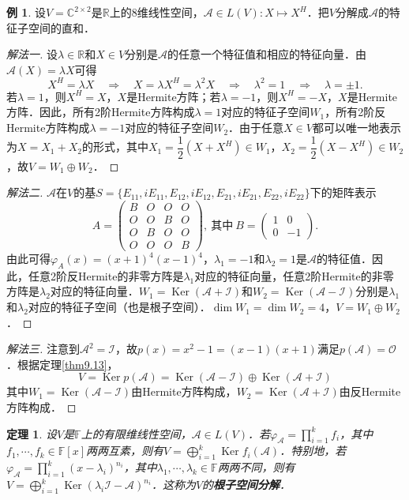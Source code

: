 \documentclass[a4paper,fontset=windows]{ctexbook}
\newtheorem{theorem}{定理}[chapter]
\theoremstyle{definition}
\newtheorem{example}{例}[chapter]
\DeclareMathOperator{\Ker}{Ker}
\begin{document}
\begin{example}
设$V=\mathbb{C}^{2\times 2}$是$\mathbb{R}$上的8维线性空间，$\mathcal{A}\in L(V):X\mapsto X^H$．把$V$分解成$\mathcal{A}$的特征子空间的直和．
\end{example}

\begin{proof}[解法一]
设$\lambda\in\mathbb{R}$和$X\in V$分别是$\mathcal{A}$的任意一个特征值和相应的特征向量．由$\mathcal{A}(X)=\lambda X$可得
$$X^H=\lambda X\quad\Rightarrow\quad X=\lambda X^H=\lambda^2X\quad\Rightarrow\quad\lambda^2=1\quad\Rightarrow\quad\lambda=\pm 1.$$
若$\lambda=1$，则$X^H=X$，$X$是Hermite方阵；若$\lambda=-1$，则$X^H=-X$，$X$是Hermite方阵．因此，所有2阶Hermite方阵构成$\lambda=1$对应的特征子空间$W_1$，所有2阶反Hermite方阵构成$\lambda=-1$对应的特征子空间$W_2$．由于任意$X\in V$都可以唯一地表示为$X=X_1+X_2$的形式，其中$X_1=\dfrac{1}{2}(X+X^H)\in W_1$，$X_2=\dfrac{1}{2}(X-X^H)\in W_2$，故$V=W_1\oplus W_2$．
\end{proof}

\begin{proof}[解法二]
$\mathcal{A}$在$V$的基$S=\{E_{11},iE_{11},E_{12},iE_{12},E_{21},iE_{21},E_{22},iE_{22}\}$下的矩阵表示
$$A=\begin{pmatrix}B&O&O&O \\ O&O&B&O \\ O&B&O&O\\ O&O&O&B\end{pmatrix},~\text{其中}~B=\begin{pmatrix}1&0 \\ 0&-1\end{pmatrix}.$$
由此可得$\varphi_A(x)=(x+1)^4(x-1)^4$，$\lambda_1=-1$和$\lambda_2=1$是$\mathcal{A}$的特征值．因此，任意2阶反Hermite的非零方阵是$\lambda_1$对应的特征向量，任意2阶Hermite的非零方阵是$\lambda_2$对应的特征向量．$W_1=\Ker(\mathcal{A+I})$和$W_2=\Ker(\mathcal{A-I})$分别是$\lambda_1$和$\lambda_2$对应的特征子空间（也是根子空间）．$\dim W_1=\dim W_2=4$，$V=W_1\oplus W_2$．
\end{proof}

\begin{proof}[解法三]
注意到$\mathcal{A}^2=\mathcal{I}$，故$p(x)=x^2-1=(x-1)(x+1)$满足$p(\mathcal{A})=\mathcal{O}$．根据定理\ref{thm9.13}，
$$V=\Ker p(\mathcal{A})=\Ker(\mathcal{A-I})\oplus\Ker(\mathcal{A+I})$$
其中$W_1=\Ker(\mathcal{A-I})$由Hermite方阵构成，$W_2=\Ker(\mathcal{A+I})$由反Hermite方阵构成．
\end{proof}

\begin{theorem}\label{thm9.14}
设$V$是$\mathbb{F}$上的有限维线性空间，$\mathcal{A}\in L(V)$．若$\varphi_{\mathcal{A}}=\prod\limits_{i=1}^kf_i$，其中$f_1,\cdots,f_k\in\mathbb{F}[x]$两两互素，则有$V=\bigoplus\limits_{i=1}^k\Ker f_i(\mathcal{A})$．特别地，若$\varphi_{\mathcal{A}}=\prod\limits_{i=1}^k(x-\lambda_i)^{n_i}$，其中$\lambda_1,\cdots,\lambda_k\in\mathbb{F}$两两不同，则有$V=\bigoplus\limits_{i=1}^k\Ker(\lambda_i\mathcal{I-A})^{n_i}$．这称为$V$的{\bf 根子空间分解}．
\end{theorem}
\end{document}
